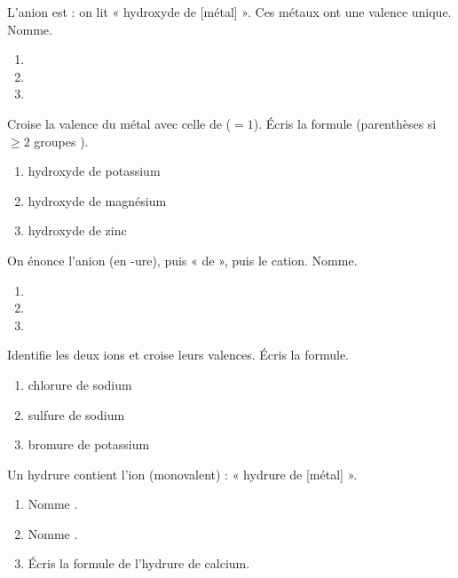 \documentclass[11pt,a4paper]{article}
\begin{document}
\begin{exo}
L'anion est  : on lit « hydroxyde de [métal] ». Ces métaux ont une valence unique. Nomme.
\begin{enumerate}[label=\alph*)]
  \item {}
  \item {}
  \item {}
\end{enumerate}
\end{exo}

\begin{exo}
Croise la valence du métal avec celle de  ($=1$). Écris la formule (parenthèses si $\geq 2$ groupes ).
\begin{enumerate}[label=\alph*)]
  \item hydroxyde de potassium
  \item hydroxyde de magnésium
  \item hydroxyde de zinc
\end{enumerate}
\end{exo}

\begin{exo}
On énonce l'anion (en -ure), puis « de », puis le cation. Nomme.
\begin{enumerate}[label=\alph*)]
  \item {}
  \item {}
  \item {}
\end{enumerate}
\end{exo}

\begin{exo}
Identifie les deux ions et croise leurs valences. Écris la formule.
\begin{enumerate}[label=\alph*)]
  \item chlorure de sodium
  \item sulfure de sodium
  \item bromure de potassium
\end{enumerate}
\end{exo}

\begin{exo}
Un hydrure contient l'ion  (monovalent) : « hydrure de [métal] ».
\begin{enumerate}[label=\alph*)]
  \item Nomme .
  \item Nomme .
  \item Écris la formule de l'hydrure de calcium.
\end{enumerate}
\end{exo}
\end{document}
